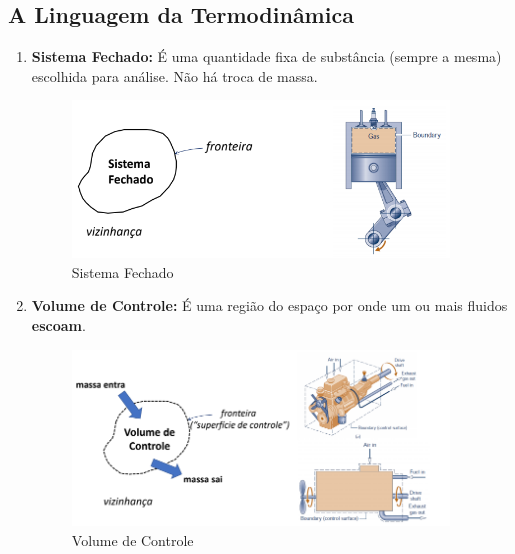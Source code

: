 \documentclass[a4paper, 12pt]{article}
\begin{document}
\subsection{A Linguagem da Termodinâmica}
	\begin{enumerate}
		\item \textbf{Sistema Fechado:} É uma quantidade fixa de substância (sempre a mesma) escolhida para análise. Não há troca de massa.
			\begin{figure}[h]
				\includegraphics[width=10cm]{sf.png}
				\centering
				\caption{Sistema Fechado}
			\end{figure}
		
		\item \textbf{Volume de Controle:} É uma região do espaço por onde um ou mais fluidos \textbf{escoam}.
			\begin{figure}[h]
				\includegraphics[width=10cm]{vc.png}
				\centering
				\caption{Volume de Controle}
			\end{figure}
	\end{enumerate}
\end{document}
